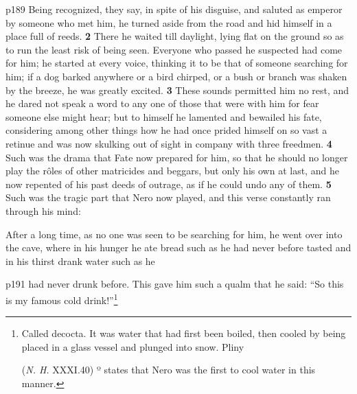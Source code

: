 p189 Being recognized, they say, in spite of his disguise, and saluted as emperor by someone who met him, he turned aside from the road and hid himself in a place full of reeds. \textbf{2} There he waited till daylight, lying flat on the ground so as to run the least risk of being seen. Everyone who passed he suspected had come for him; he started at every voice, thinking it to be that of someone searching for him; if a dog barked anywhere or a bird chirped, or a bush or branch was shaken by the breeze, he was greatly excited. \textbf{3} These sounds permitted him no rest, and he dared not speak a word to any one of those that were with him for fear someone else might hear; but to himself he lamented and bewailed his fate, considering among other things how he had once prided himself on so vast a retinue and was now skulking out of sight in company with three freedmen. \textbf{4} Such was the drama that Fate now prepared for him, so that he should no longer play the rôles of other matricides and beggars, but only his own at last, and he now repented of his past deeds of outrage, as if he could undo any of them. \textbf{5} Such was the tragic part that Nero now played, and this verse constantly ran through his mind:

After a long time, as no one was seen to be searching for him, he went over into the cave, where in his hunger he ate bread such as he had never before tasted and in his thirst drank water such as he

p191 had never drunk before. This gave him such a qualm that he said: ``So this is my famous cold drink!''\footnote{Called decocta. It was water that had first been boiled, then cooled by being placed in a glass vessel and plunged into snow. Pliny

(\emph{N. H.} XXXI.40) º states that Nero was the first to cool water in this manner.

}

